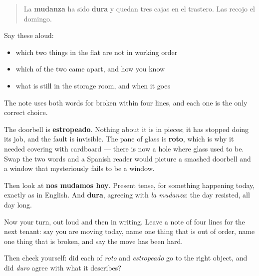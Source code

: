 \begin{quote}
La \textbf{mudanza} ha sido \textbf{dura} y quedan tres cajas en el trastero. Las recojo el domingo.
\end{quote}

Say these aloud:

\begin{itemize}
\raggedright
  \item which two things in the flat are not in working order
  \item which of the two came apart, and how you know
  \item what is still in the storage room, and when it goes
\end{itemize}

\begin{culture}
The note uses both words for broken within four lines, and each one is the only correct choice.

The doorbell is \textbf{estropeado}. Nothing about it is in pieces; it has stopped doing its job, and the fault is invisible. The pane of glass is \textbf{roto}, which is why it needed covering with cardboard — there is now a hole where glass used to be. Swap the two words and a Spanish reader would picture a smashed doorbell and a window that mysteriously fails to be a window.

Then look at \textbf{nos mudamos hoy}. Present tense, for something happening today, exactly as in English. And \textbf{dura}, agreeing with \emph{la mudanza}: the day resisted, all day long.
\end{culture}

\begin{tcolorbox}[breakable,colback=teal!4,colframe=teal!35!black,title={Before you move on}]
Now your turn, out loud and then in writing. Leave a note of four lines for the next tenant: say you are moving today, name one thing that is out of order, name one thing that is broken, and say the move has been hard.

Then check yourself: did each of \emph{roto} and \emph{estropeado} go to the right object, and did \emph{duro} agree with what it describes?
\end{tcolorbox}
